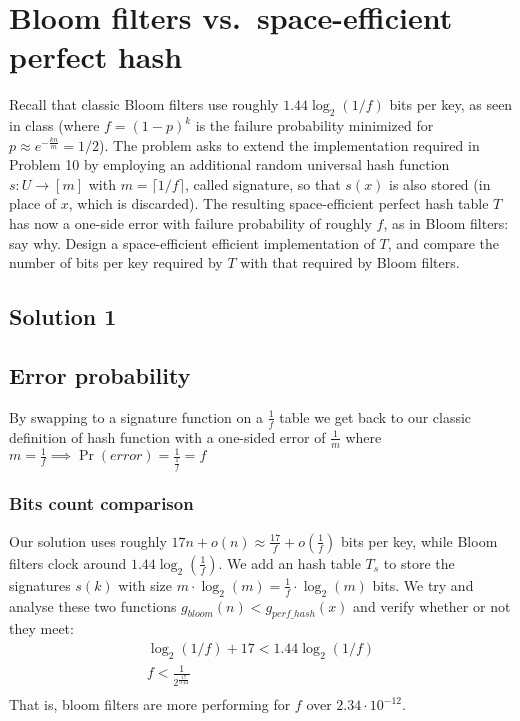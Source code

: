 \section{Bloom filters vs.\ space-efficient perfect hash}

Recall that classic Bloom filters use roughly $1.44\log_2(1/f)$ bits per key, as
seen in class (where $f=(1-p)^k$ is the failure probability minimized for
$p \approx e^{-\frac{kn}{m}} = 1/2$).
The problem asks to extend the implementation required in Problem 10 by employing
an additional random universal hash function $s : U \to [m]$ with $m = \lceil 1/f \rceil$,
called signature, so that $s(x)$ is also stored (in place of $x$, which is discarded).
The resulting space-efficient perfect hash table $T$ has now a one-side error with
failure probability of roughly $f$, as in Bloom filters: say why.
Design a space-efficient efficient implementation of $T$, and compare the number
of bits per key required by $T$ with that required by Bloom filters.

\subsection{Solution 1}

\subsection{Error probability}
By swapping to a signature function on a $\frac{1}{f}$ table we get back to our classic definition of hash function with a one-sided error of $\frac{1}{m}$ where $m = \frac{1}{f} \implies \Pr(error) = \frac{1}{\frac{1}{f}} = f$

\subsubsection{Bits count comparison}

Our solution uses roughly $17n + o(n) \approx \frac{17}{f} + o(\frac{1}{f})$ bits
per key, while Bloom filters clock around $1.44 \log_2(\frac{1}{f})$.
We add an hash table $T_s$ to store the signatures $s(k)$ with size
$m \cdot \log_2(m) = \frac{1}{f} \cdot \log_2(m)$ bits.
We try and analyse these two functions $g_{bloom}(n) < g_{perf\_hash}(x)$ and verify
whether or not they meet:
\begin{align*}
\log_2(1/f) + 17 < 1.44 \log_2(1/f) \\
f < \frac{1}{2^{\frac{17}{0.44}}} \\
\end{align*}
That is, bloom filters are more performing for $f$ over $2.34\cdot10^{-12}$.
